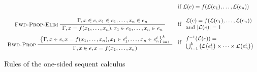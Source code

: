 \begin{table}
\begin{gather*}
\begin{array}{cl}
      &
        \text{if~} \lang{e} = f(\lang{e_1}, \ldots, \lang{e_n})
      \\[3ex]
      \infer[Fwd-Prop-Elim]
      {\seqq{x = f(x_1, \ldots, x_n), x_1 \in e_1, \ldots, x_n \in e_n}}
      {\seqq{x \in e, x_1 \in e_1, \ldots, x_n \in e_n}}
      &
        \text{if~}
        \begin{array}{l}
          \lang{e} = f(\lang{e_1}, \ldots, \lang{e_n})
          \\
          \text{and~} 
          |\lang{e}|= 1
          \end{array}
      \\[3ex]
      \infer[Bwd-Prop]
      {\seqq{x \in e, x = f(x_1, \ldots, x_n)}}
      {\big\{\seqq{x \in e, x = f(x_1, \ldots, x_n),
      x_1 \in e_1^i, \ldots, x_n \in e_n^i}\big\}_{i=1}^k}
      &
        \text{if~}
        \begin{array}{l}
          f^{-1}(\lang{e}) = \\
          \bigcup_{i=1}^k \big( \lang{e_1^i} \times \cdots \times \lang{e_n^i} \big)
          \end{array}
    \end{array}
  \end{gather*}
  
  \caption{Rules of the one-sided sequent calculus}
\end{table}


